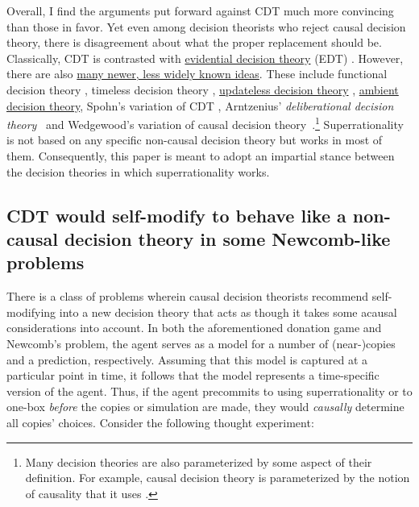 Overall, I find the arguments put forward against CDT much more
convincing than those in favor. Yet even among decision theorists who
reject causal decision theory, there is disagreement about what the
proper replacement should be. Classically, CDT is contrasted with
\href{https://en.wikipedia.org/wiki/Evidential_decision_theory}{evidential
decision theory} (EDT)
\parencite{Ahmed2014-ec,Almond2010-xn,Price1986-qs,Horgan1981-hb}.
However, there are also
\href{https://casparoesterheld.com/a-comprehensive-list-of-decision-theories/}{many
newer, less widely known ideas}. These include functional decision
theory \parencite{Soares_undated-aj}, timeless decision
theory \parencite{Yudkowsky2010-ul},
\href{https://wiki.lesswrong.com/wiki/Updateless_decision_theory}{updateless
decision theory}
\parencite{Benson-Tilsen2014-cv,Hintze2014-xs,McAllister_undated-ms},
\href{https://wiki.lesswrong.com/wiki/Ambient_decision_theory}{ambient
decision theory}, Spohn's variation of CDT
\parencite{Spohn2003-zf,Spohn2005-tm,Spohn2012-fo},
Arntzenius' \emph{deliberational decision theory}~\citeyear{Arntzenius2008-wh} and
Wedgewood's variation of causal decision theory~\citeyear{Wedgwood2013-mt}.\footnote{Many decision
  theories are also parameterized by some aspect of their definition.
  For example, causal decision theory is parameterized by the notion of
  causality that it uses
  \parencite{Lewis1981-ct,Hajek2006-me,Weirich2016-gq,Pearl2009-xn}.}
Superrationality is not based on any specific non-causal decision theory
but works in most of them. Consequently, this paper is meant to adopt an
impartial stance between the decision theories in which superrationality
works.

\hypertarget{cdt-would-self-modify-to-behave-like-a-non-causal-decision-theory-in-some-newcomb-like-problems}{\subsection{CDT
would self-modify to behave like a non-causal decision theory in some
Newcomb-like problems
}\label{cdt-would-self-modify-to-behave-like-a-non-causal-decision-theory-in-some-newcomb-like-problems}}

There is a class of problems wherein causal decision theorists
recommend self-modifying into a new decision theory that acts as though
it takes some acausal considerations into account. In both the
aforementioned donation game and Newcomb's problem, the agent serves as
a model for a number of (near-)copies and a prediction, respectively.
Assuming that this model is captured at a particular point in time, it
follows that the model represents a time-specific version of the agent.
Thus, if the agent precommits to using superrationality or to one-box
\emph{before} the copies or simulation are made, they would
\emph{causally} determine all copies' choices. Consider the following
thought experiment:

